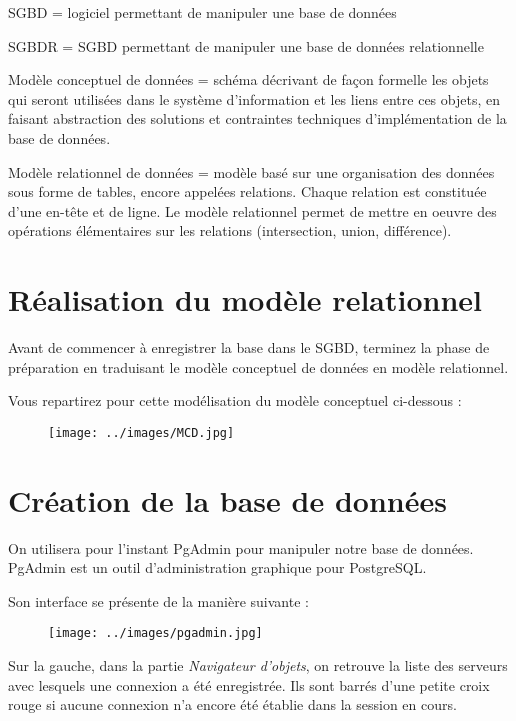 \documentclass[11pt]{article}
\begin{document}
	SGBD = logiciel permettant de manipuler une base de données
	
	SGBDR = SGBD permettant de manipuler une base de données relationnelle
	
	Modèle conceptuel de données = schéma décrivant de façon formelle les objets qui seront utilisées dans le système d'information et les liens entre ces objets, en faisant abstraction des solutions et contraintes techniques d'implémentation de la base de données.
	
	Modèle relationnel de données = modèle basé sur une organisation des données sous forme de tables, encore appelées relations. Chaque relation est constituée d'une en-tête et de ligne. Le modèle relationnel permet de mettre en oeuvre des opérations élémentaires sur les relations (intersection, union, différence).
	
	
	
	\section{Réalisation du modèle relationnel}
		Avant de commencer à enregistrer la base dans le SGBD, terminez la phase de préparation en traduisant le modèle conceptuel de données en modèle relationnel.
		
		Vous repartirez pour cette modélisation du modèle conceptuel ci-dessous :
		\begin{figure}[H]
			\center \texttt{[image: ../images/MCD.jpg]}\\[1em]
		\end{figure}
		
		
	\section{Création de la base de données}
		On utilisera pour l'instant PgAdmin pour manipuler notre base de données. PgAdmin est un outil d'administration graphique pour PostgreSQL.
		
		Son interface se présente de la manière suivante :
		\begin{figure}[H]
			\center \texttt{[image: ../images/pgadmin.jpg]}\\[1em]
		\end{figure}
		
		Sur la gauche, dans la partie \textit{Navigateur d'objets}, on retrouve la liste des serveurs avec lesquels une connexion a été enregistrée. Ils sont barrés d'une petite croix rouge si aucune connexion n'a encore été établie dans la session en cours.
		
\end{document}
